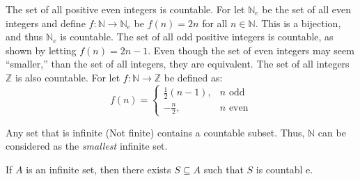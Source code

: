         \begin{example}
            The set of all positive even integers is
            countable. For let $\mathbb{N}_{e}$ be the
            set of all even integers and define
            $f:\mathbb{N}\rightarrow\mathbb{N}_{e}$ be
            $f(n)=2n$ for all $n\in\mathbb{N}$. This is
            a bijection, and thus $\mathbb{N}_{e}$ is
            countable. The set of all odd positive integers
            is countable, as shown by letting
            $f(n)=2n-1$. Even though the set of even
            integers may seem ``smaller,'' than the set of
            all integers, they are equivalent. The set of
            all integers $\mathbb{Z}$ is also countable.
            For let $f:\mathbb{N}\rightarrow\mathbb{Z}$
            be defined as:
            \begin{equation}
                f(n)=
                \begin{cases}
                    \frac{1}{2}(n-1),&n\textrm{ odd}\\
                    -\frac{n}{2},&n\textrm{ even}
                \end{cases}
            \end{equation}
        \end{example}
        Any set that is infinite (Not finite) contains a
        countable subset. Thus, $\mathbb{N}$ can be
        considered as the \textit{smallest} infinite set.
        \begin{theorem}
            If $A$ is an infinite set, then there exists
            $S\subseteq{A}$ such that $S$ is countabl e.
        \end{theorem}
